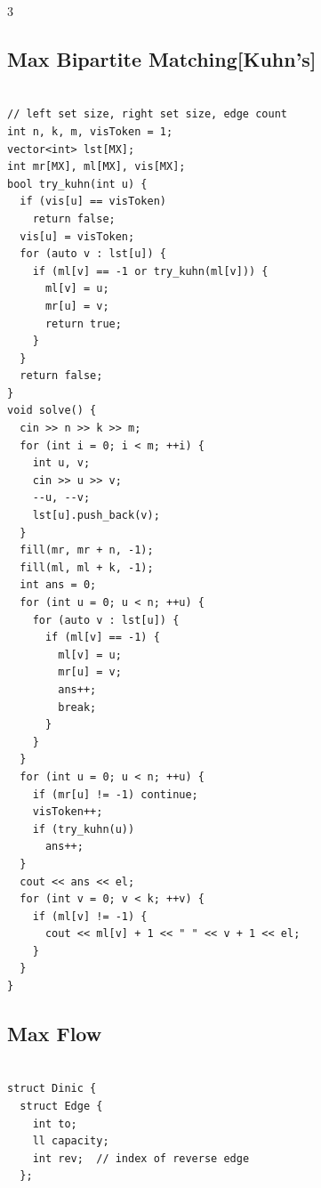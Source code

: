 \documentclass[10pt, landscape, a4paper, onesided]{extarticle}
\begin{document}
\begin{multicols*}{3}
\subsection{Max Bipartite Matching[Kuhn's]}
\begin{verbatim}

// left set size, right set size, edge count
int n, k, m, visToken = 1;
vector<int> lst[MX];
int mr[MX], ml[MX], vis[MX];
bool try_kuhn(int u) {
  if (vis[u] == visToken)
    return false;
  vis[u] = visToken;
  for (auto v : lst[u]) {
    if (ml[v] == -1 or try_kuhn(ml[v])) {
      ml[v] = u;
      mr[u] = v;
      return true;
    }
  }
  return false;
}
void solve() {
  cin >> n >> k >> m;
  for (int i = 0; i < m; ++i) {
    int u, v;
    cin >> u >> v;
    --u, --v;
    lst[u].push_back(v);
  }
  fill(mr, mr + n, -1);
  fill(ml, ml + k, -1);
  int ans = 0;
  for (int u = 0; u < n; ++u) {
    for (auto v : lst[u]) {
      if (ml[v] == -1) {
        ml[v] = u;
        mr[u] = v;
        ans++;
        break;
      }
    }
  }
  for (int u = 0; u < n; ++u) {
    if (mr[u] != -1) continue;
    visToken++;
    if (try_kuhn(u))
      ans++;
  }
  cout << ans << el;
  for (int v = 0; v < k; ++v) {
    if (ml[v] != -1) {
      cout << ml[v] + 1 << " " << v + 1 << el;
    }
  }
}
\end{verbatim}

\subsection{Max Flow}
\begin{verbatim}

struct Dinic {
  struct Edge {
    int to;
    ll capacity;
    int rev;  // index of reverse edge
  };


\end{verbatim}
\end{multicols*}
\end{document}
